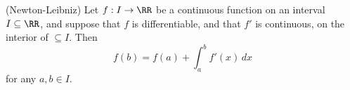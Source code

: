 

\begin{theorem}
(Newton-Leibniz) Let $f: I\to \RR $ be a continuous function on 
an interval $I\subseteq \RR$, and suppose that $f$ is differentiable, 
and that $f'$ is continuous, on the interior of $\subseteq I$. Then
$$
f(b) = f(a) + \int_a^b f'(x)\,dx
$$
for any $a, b\in I$.
\end{theorem}

